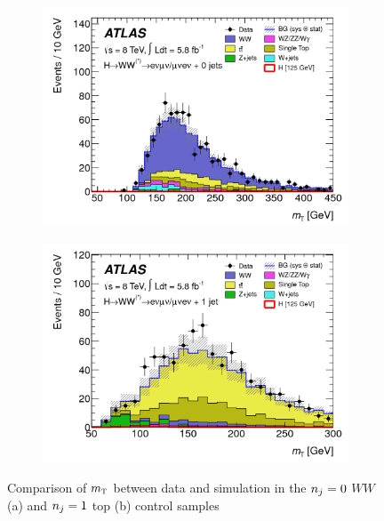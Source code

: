 \begin{figure}[h!]
  \centering
  \captionsetup{justification=centering}

   \begin{subfigure}[t]{0.5\textwidth}
        \centering
        \includegraphics[width=\textwidth]{figures/disc_mt_wwcr}
        \caption{}
    \end{subfigure}%
    \begin{subfigure}[t]{0.5\textwidth}
        \centering
        \includegraphics[width=\textwidth]{figures/disc_mt_topcr}
        \caption{}
    \end{subfigure}


   \caption{Comparison of $m_{\textrm{\footnotesize\sc t}}$ between data and simulation in the $n_j = 0$ $WW$ (a) and $n_j = 1$ top (b) control samples~\cite{Discovery}}
  \label{fig:disc_mt_cr}
\end{figure}

